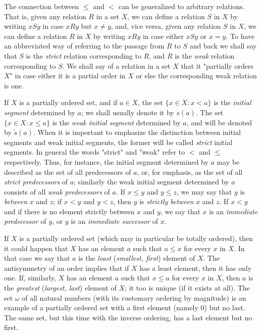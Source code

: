 The connection between $\le$ and $<$ can be generalized to arbitrary relations. That is, given any relation $R$ in a set $X$, we can define a relation $S$ in $X$ by writing $xSy$ in case $xRy$ but $x \neq y$, and, vice versa, given any relation $S$ in $X$, we can define a relation $R$ in $X$ by writing $xRy$ in case either $xSy$ or $x = y$. To have an abbreviated way of referring to the passage from $R$ to $S$ and back we shall say that $S$ is the \textit{strict} relation corresponding to $R$, and $R$ is the \textit{weak} relation corresponding to $S$. We shall say of a relation in a set $X$ that it "partially orders $X$" in case either it is a partial order in $X$ or else the corresponding weak relation is one.

If $X$ is a partially ordered set, and if $a \in X$, the set $\{ x \in X:x < a \}$ is the \textit{initial segment} determined by $a$; we shall usually denote it by $s(a)$. The set $\{ x \in X: x \le a \}$ is the \textit{weak initial segment} determined by $a$, and will be denoted by $\tilde{s}(a)$. When it is important to emphasize the distinction between initial segments and weak initial segments, the former will be called \textit{strict} initial segments. In general the words "strict" and "weak" refer to $<$ and $\le$ respectively. Thus, for instance, the initial segment determined by $a$ may be described as the set of all predecessors of $a$, or, for emphasis, as the set of all \textit{strict predecessors} of $a$; similarly the weak initial segment determined by $a$ consists of all \textit{weak predecessors} of $a$. If $x \le y$ and $y \le z$, we may say that $y$ is \textit{between} $x$ and $z$; if $x < y$ and $y < z$, then $y$ is \textit{strictly between} $x$ and $z$. If $x < y$ and if there is no element strictly between $x$ and $y$, we say that $x$ is an \textit{immediate predecessor} of $y$, or $y$ is an \textit{immediate successor} of $x$. 

If $X$ is a partially ordered set (which may in particular be totally ordered), then it could happen that $X$ has an element $a$ such that $a \le x$ for every $x$ in $X$. In that case we say that $a$ is the \textit{least} (\textit{smallest, first}) element of $X$. The antisymmetry of an order implies that if $X$ has a least element, then it has only one. If, similarly, $X$ has an element $a$ such that $x \le a$ for every $x$ in $X$, then $a$ is the \textit{greatest} (\textit{largest, last}) element of $X$; it too is unique (if it exists at all). The set $\omega$ of all natural numbers (with its customary ordering by magnitude) is an example of a partially ordered set with a first element (namely $0$) but no last. The same set, but this time with the inverse ordering, has a last element but no first. 

